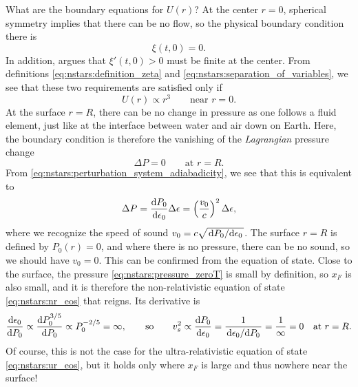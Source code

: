 What are the boundary equations for $U(r)$?
At the center $r = 0$, spherical symmetry implies that there can be no flow, so the physical boundary condition there is
\begin{equation}
	\xi(t, 0) = 0.
\label{eq:nstars:boundary_condition_center_physical}
\end{equation}
In addition, \cite{ref:stability_methods} argues that $\xi'(t,0) > 0$ must be finite at the center.
From definitions \eqref{eq:nstars:definition_zeta} and \eqref{eq:nstars:separation_of_variables}, we see that these two requirements are satisfied only if
\begin{equation}
	U(r) \propto r^3
	\qquad \text{near } r = 0.
\label{eq:nstars:boundary_condition_center_mathematical}
\end{equation}
At the surface $r = R$, there can be no change in pressure as one follows a fluid element, just like at the interface between water and air down on Earth.
Here, the boundary condition is therefore the vanishing of the \emph{Lagrangian} pressure change
\begin{equation}
	\Delta P = 0
	\qquad \text{at } r = R.
\label{eq:nstars:boundary_condition_surface_physical}
\end{equation}
From \cref{eq:nstars:perturbation_system_adiabadicity}, we see that this is equivalent to
\begin{equation}
	\Delta P = \odv{P_0}{\epsilon_0} \Delta \epsilon = \left( \frac{v_0}{c} \right)^2 \Delta\epsilon ,
\label{eq:nstars:deltaP_product}
\end{equation}
where we recognize the speed of sound $v_0 = c \sqrt{\odv{P_0}/{\epsilon_0}}$.
The surface $r = R$ is defined by $P_0(r) = 0$, and where there is no pressure, there can be no sound, so we should have $v_0 = 0$.
This can be confirmed from the equation of state.
Close to the surface, the pressure \eqref{eq:nstars:pressure_zeroT} is small by definition, so $x_F$ is also small, and it is therefore the non-relativistic equation of state \eqref{eq:nstars:nr_eos} that reigns.
Its derivative is
\begin{equation}
	\odv{\epsilon_0}{P_0} \propto \odv{P_0^{3/5}}{P_0} \propto P_0^{-2/5} = \infty ,
	\qquad \text{so} \qquad
	v_s^2 \propto \odv{P_0}{\epsilon_0} = \frac{1}{\odv{\epsilon_0}/{P_0}} = \frac{1}{\infty} = 0
	\quad \text{at } r = R.
\end{equation}
Of course, this is not the case for the ultra-relativistic equation of state \eqref{eq:nstars:ur_eos}, but it holds only where $x_F$ is large and thus nowhere near the surface!
